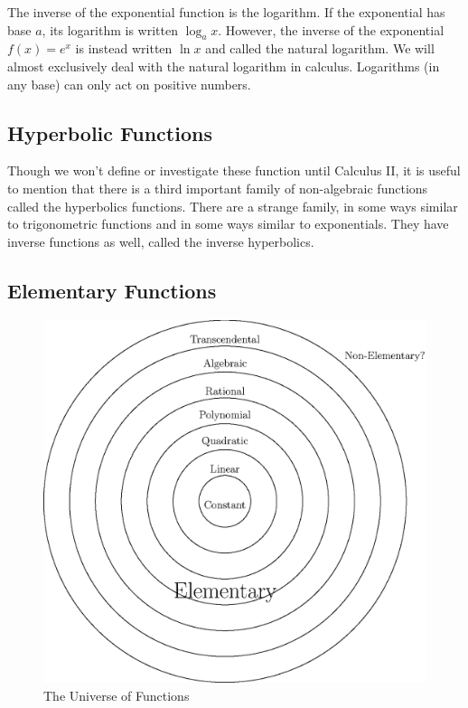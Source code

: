 \documentclass[fleqn]{report}
\begin{document}
The inverse of the exponential function is the logarithm. If the
exponential has base $a$, its logarithm is written
$\log_a x$. However, the inverse of the exponential $f(x) =
e^x$ is instead written $\ln x$ and
called the natural logarithm. We
will almost exclusively deal with the natural logarithm in
calculus. Logarithms (in any base) can only act on positive
numbers.

\subsection{Hyperbolic Functions}
\label{hyperbolic-functions}

Though we won't define or investigate these function until
Calculus II, it is useful to mention that there is a third important
family of non-algebraic functions called the hyperbolics
functions. There are a strange family, in some ways similar
to trigonometric functions and in some ways similar to
exponentials. They have inverse functions as well, called the
inverse hyperbolics. 

\subsection{Elementary Functions}
\label{elementary}

\begin{figure}[t]
\centering
\includegraphics[width=12cm]{figure35.eps}
\caption{The Universe of Functions}
\label{figure-universe-of-functions}
\end{figure}
\end{document}
